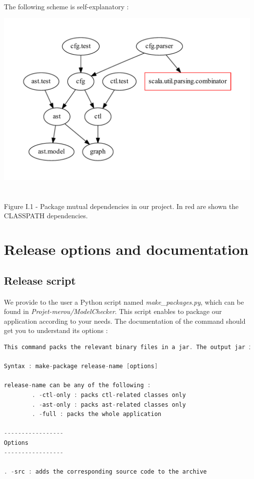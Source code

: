 \documentclass{report}
\begin{document}
\paragraph{}
\hspace{4mm}The following scheme is self-explanatory :

\begin{center}
\includegraphics[scale=0.65]{data/dependencies}
~\\~\\Figure I.1 - Package mutual dependencies in our project. In red are shown the CLASSPATH dependencies.
\end{center}

\section{Release options and documentation}

\subsection{Release script}

\paragraph{}
\hspace{4mm}We provide to the user a Python script named \textit{make\_packages.py}, which can be found in \textit{Projet-merou/ModelChecker}.
This script enables to package our application according to your needs. The documentation of the command should get you to understand its options :

\begin{lstlisting}[language=c++]
This command packs the relevant binary files in a jar. The output jar is stored in the release folder.

Syntax : make-package release-name [options]

release-name can be any of the following :
        . -ctl-only : packs ctl-related classes only
        . -ast-only : packs ast-related classes only
        . -full : packs the whole application

-----------------
Options
-----------------

. -src : adds the corresponding source code to the archive
\end{lstlisting}
\end{document}
